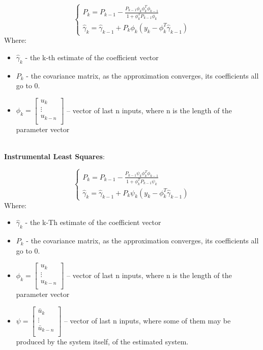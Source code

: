     \begin{equation}
        \begin{cases}
            P_k = P_{k-1} - \frac{P_{k-1}\phi_k\phi_k^{T}\phi_{k-1}}{1+\phi_k^{T}P_{k-1}\phi_k}\\
            \hat{\gamma}_k = \hat{\gamma}_{k-1} + P_k\phi_k(y_k - \phi_k^{T}\hat{\gamma}_{k-1})
        \end{cases}
    \end{equation}
    Where:
    \begin{itemize}
        \item $\hat{\gamma}_k$ - the k-th estimate of the coefficient vector
        \item  $P_k$ - the covariance matrix, as the approximation converges, its coefficients all go to 0.
        \item  $\phi_k = \begin{bmatrix}
       u_k \\
                  \vdots \\
                  u_{k-n} \\
\end{bmatrix}$ -- vector of last  n inputs, where n is the length of the parameter vector
    \end{itemize}
\\
\textbf{Instrumental Least Squares}:

    \begin{equation}
        \begin{cases}
            P_k = P_{k-1} - \frac{P_{k-1}\psi_k\phi_k^{T}\phi_{k-1}}{1+\phi_k^{T}P_{k-1}\psi_k}\\
            \hat{\gamma}_k = \hat{\gamma}_{k-1} + P_k\psi_k(y_k - \phi_k^{T}\hat{\gamma}_{k-1})
        \end{cases}
    \end{equation}
    Where:
    \begin{itemize}
        \item $\hat{\gamma}_k$ - the k-Th estimate of the coefficient vector
        \item  $P_k$ - the covariance matrix, as the approximation converges, its coefficients all go to 0.
        \item  $\phi_k = \begin{bmatrix}
       u_k \\
                  \vdots \\
                  u_{k-n} \\
\end{bmatrix}$ -- vector of last  n inputs, where n is the length of the parameter vector

        \item  $\psi = \begin{bmatrix}
                \bar{u}_k \\
                  \vdots \\
                  \bar{u}_{k-n} \\
\end{bmatrix}$ -- vector of last  n inputs, where some of them may be produced by the system itself, of the estimated system.
    \end{itemize}

